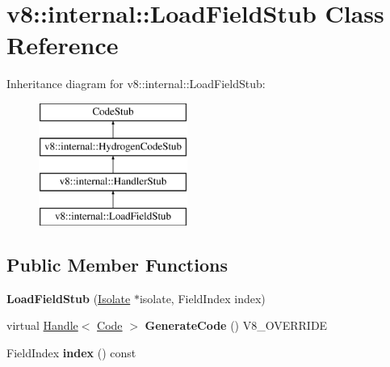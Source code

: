 \hypertarget{classv8_1_1internal_1_1_load_field_stub}{}\section{v8\+:\+:internal\+:\+:Load\+Field\+Stub Class Reference}
\label{classv8_1_1internal_1_1_load_field_stub}
Inheritance diagram for v8\+:\+:internal\+:\+:Load\+Field\+Stub\+:\begin{figure}[H]
\begin{center}
\leavevmode
\includegraphics[height=4.000000cm]{classv8_1_1internal_1_1_load_field_stub}
\end{center}
\end{figure}
\subsection*{Public Member Functions}
\begin{DoxyCompactItemize}
\item 
\hypertarget{classv8_1_1internal_1_1_load_field_stub_a7e59d0b99f6ad876cce69bffa9e21c6a}{}{\bfseries Load\+Field\+Stub} (\hyperlink{classv8_1_1internal_1_1_isolate}{Isolate} $\ast$isolate, Field\+Index index)\label{classv8_1_1internal_1_1_load_field_stub_a7e59d0b99f6ad876cce69bffa9e21c6a}

\item 
\hypertarget{classv8_1_1internal_1_1_load_field_stub_a275c7741dc3a7b1ba88d2e49482c67d2}{}virtual \hyperlink{classv8_1_1internal_1_1_handle}{Handle}$<$ \hyperlink{classv8_1_1internal_1_1_code}{Code} $>$ {\bfseries Generate\+Code} () V8\+\_\+\+O\+V\+E\+R\+R\+I\+D\+E\label{classv8_1_1internal_1_1_load_field_stub_a275c7741dc3a7b1ba88d2e49482c67d2}

\item 
\hypertarget{classv8_1_1internal_1_1_load_field_stub_a931b1f06ba32b0681707c69bf2014762}{}Field\+Index {\bfseries index} () const \label{classv8_1_1internal_1_1_load_field_stub_a931b1f06ba32b0681707c69bf2014762}

\end{DoxyCompactItemize}
